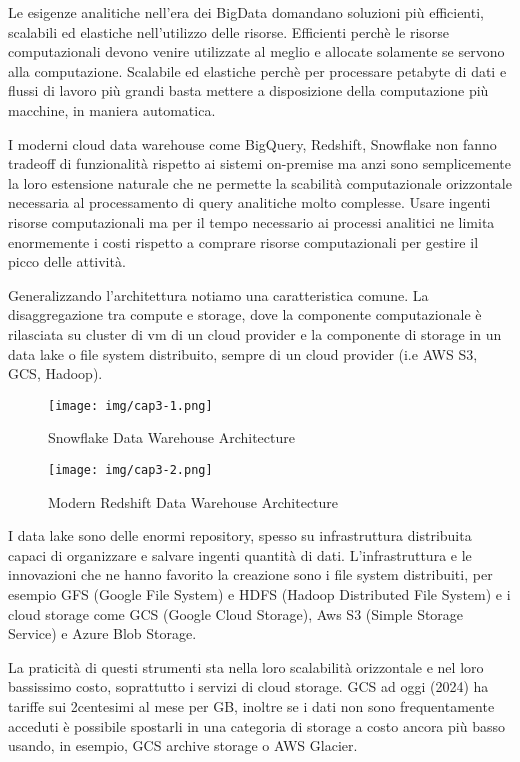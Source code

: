 \documentclass[a4paper,12pt]{report}
\begin{document}
\noindent
Le esigenze analitiche nell’era dei BigData domandano soluzioni più efficienti, scalabili ed elastiche nell’utilizzo delle risorse.
Efficienti perchè le risorse computazionali devono venire utilizzate al meglio e allocate solamente se servono alla computazione.
Scalabile ed elastiche perchè per processare petabyte di dati e flussi di lavoro più grandi basta mettere a disposizione della computazione più macchine, in maniera automatica.


\noindent
I moderni cloud data warehouse come BigQuery, Redshift, Snowflake non fanno tradeoff di funzionalità rispetto ai sistemi on-premise ma anzi sono semplicemente la loro estensione naturale che ne permette la scabilità computazionale orizzontale necessaria al processamento di query analitiche molto complesse. Usare ingenti risorse computazionali ma per il tempo necessario ai processi analitici ne limita enormemente i costi rispetto a comprare risorse computazionali per gestire il picco delle attività.

\noindent
Generalizzando l’architettura notiamo una caratteristica comune. La disaggregazione tra compute e storage, dove la componente computazionale è rilasciata su cluster di vm di un cloud provider e la componente di storage in un data lake o file system distribuito, sempre di un cloud provider (i.e AWS S3, GCS, Hadoop). 


\begin{figure}[h]
    \centering
    \texttt{[image: img/cap3-1.png]}
    \caption{Snowflake Data Warehouse Architecture}
\end{figure}

\begin{figure}[h]
    \centering
    \texttt{[image: img/cap3-2.png]}
    \caption{Modern Redshift Data Warehouse Architecture}
\end{figure}


I data lake sono delle enormi repository, spesso su infrastruttura distribuita capaci di organizzare e salvare ingenti quantità di dati.
L’infrastruttura e le innovazioni che ne hanno favorito la creazione sono i file system distribuiti, per esempio GFS (Google File System) e HDFS (Hadoop Distributed File System) e i cloud storage come GCS (Google Cloud Storage), Aws S3 (Simple Storage Service) e Azure Blob Storage. 

\noindent
La praticità di questi strumenti sta nella loro scalabilità orizzontale e nel loro bassissimo costo, soprattutto i servizi di cloud storage. GCS ad oggi (2024) ha tariffe sui 2centesimi al mese per GB, inoltre se i dati non sono frequentamente acceduti è possibile spostarli in una categoria di storage a costo ancora più basso usando, in esempio, GCS archive storage o AWS Glacier.
\end{document}
